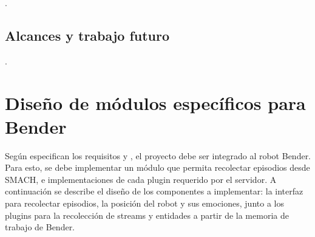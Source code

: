 .

\subsection{Alcances y trabajo futuro}
 .




\section{Diseño de módulos específicos para Bender}

Según especifican los requisitos  y , el proyecto debe ser integrado al robot Bender. Para esto, se debe implementar un módulo que permita recolectar episodios desde SMACH, e implementaciones de cada plugin requerido por el servidor. A continuación se describe el diseño de los componentes a implementar: la interfaz para recolectar episodios, la posición del robot y sus emociones, junto a los plugins para la recolección de streams y entidades a partir de la memoria de trabajo de Bender. 

